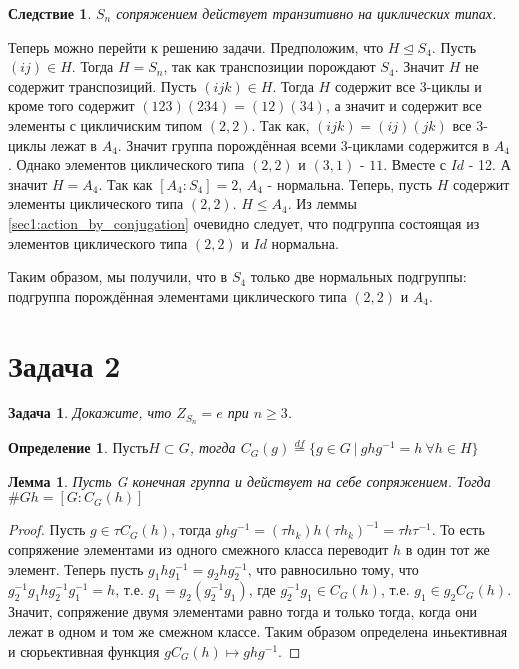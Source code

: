 \documentclass{article}
\newtheorem{task}{Задача}
\newtheorem{df}{Определение}
\newtheorem{lemma}{Лемма}
\newtheorem{cq}{Следствие}
\newcommand{\ad}[2]{#1#2#1^{-1}}
\newcommand{\dfeq}{\overset{df}{=}}
\newcommand{\normalin}{\trianglelefteq}
\newcommand{\subgroup}{\leq}
\begin{document}
\begin{cq}
$S_n$ сопряжением действует транзитивно на циклических типах.
\end{cq}
Теперь можно перейти к решению задачи. 
Предположим, что $H \normalin S_4$.
Пусть $(ij) \in H$. Тогда $H = S_n$, так как транспозиции порождают $S_4$.
Значит $H$ не содержит транспозиций. 
Пусть $(ijk) \in H$. Тогда $H$ содержит все 3-циклы и кроме того содержит  
$(123)(234) = (12)(34)$, а значит и содержит все элементы с цикличиским типом $(2, 2)$.
Так как, $(ijk) = (ij)(jk)$ все 3-циклы лежат в $A_4$. 
Значит группа порождённая всеми 3-циклами содержится в $A_4$.
Однако элементов циклического типа $(2, 2)$ и $(3, 1)$ - $11$. Вместе с $Id$ - 12.
А значит $H = A_4$. Так как $[A_4: S_4] = 2$, $A_4$ - нормальна.
Теперь, пусть $H$ содержит элементы циклического типа $(2, 2)$. $H \subgroup A_4$. 
Из леммы \ref{sec1:action_by_conjugation} очевидно следует, что подгруппа состоящая из элементов циклического типа $(2, 2)$ и $Id$ нормальна.

Таким образом, мы получили, что в $S_4$ только две нормальных подгруппы: подгруппа порождённая элементами циклического типа $(2, 2)$ и $A_4$.


\section*{Задача 2}

\begin{task}
Докажите, что $Z_{S_n} = {e}$ при $n \geq 3$.
\end{task}

\begin{df}
    $Пусть H \subset G$, тогда $C_G(g) \dfeq \{g \in G ~ | ~ \ad{g}{h} = h ~ \forall h \in H\}$
\end{df}

\begin{lemma}
Пусть G конечная группа и действует на себе сопряжением.
Тогда $\#Gh = [G: C_{G}(h)]$ 
\end{lemma}

\begin{proof}
Пусть $g \in \tau C_{G}(h)$, тогда $\ad{g}{h} = \ad{(\tau h_k)}{h} = \ad{\tau}{h}$.
То есть сопряжение элементами из одного смежного класса переводит $h$ в один тот же элемент.
Теперь пусть $\ad{g_1}{h} = \ad{g_2}{h}$, что равносильно тому, что $\ad{g_2^{-1}g_1}{h} = h$, 
т.е. $g_1 = g_2 (g_2^{-1} g_1)$, где $g_2^{-1} g_1 \in C_{G}(h)$, т.е. $g_1 \in g_2 C_{G}(h)$.
Значит, сопряжение двумя элементами равно тогда и только тогда, когда они лежат 
в одном и том же смежном классе. Таким образом определена иньективная и сюрьективная функция 
$g C_{G}(h) \mapsto \ad{g}{h}$.
\end{proof}
\end{document}
